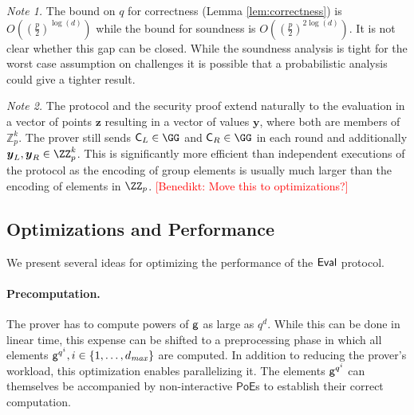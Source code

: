 \documentclass{article}
\theoremstyle{definition}
\newcommand{\benedikt}[1]{{\textcolor{red}{[Benedikt: #1]}}}
\newcommand{\alan}[1]{{\todo[color=blue!40!white]{Alan: #1}}}
\newcommand{\benedikt}[1]{}
\newcommand{\alan}[1]{}
\begin{document}
\textit{Note 1.}
The bound on $q$ for correctness (Lemma \ref{lem:correctness}) is $O((\frac{p}{2})^{\log(d)})$ while the bound for soundness is $O((\frac{p}{2})^{2 \log(d)})$. It is not clear whether this gap can be closed. While the soundness analysis is tight for the worst case assumption on challenges it is possible that a probabilistic analysis could give a tighter result.

\textit{Note 2.} The protocol and the security proof extend naturally to the evaluation in a vector of points $\boldsymbol{z}$ resulting in a vector of values $\boldsymbol{y}$, where both are members of $\mathbb{Z}_p^k$. The prover still sends $\gr{C}_L\in \GG$ and $\gr{C}_R\in \GG$ in each round and additionally $\boldsymbol{y}_L,\boldsymbol{y}_R \in \ZZ^k_p$. This is significantly more efficient than independent executions of the protocol as the encoding of group elements is usually much larger than the encoding of elements in $\ZZ_p$. \benedikt{Move this to optimizations?}
\subsection{Optimizations and Performance}
\label{subsec:optimiztion}
We present several ideas for optimizing the performance of the $\textsf{{Eval}}$ protocol.

\paragraph{Precomputation.} The prover has to compute powers of $\mathsf{g}$ as large as $q^d$. While this can be done in linear time, this expense can be shifted to a preprocessing phase in which all elements $\mathsf{g}^{q^i}, i \in \{1, \ldots, d_{\it max}\}$ are computed. In addition to reducing the prover's workload, this optimization enables parallelizing it. The elements $\mathsf{g}^{q^i}$ can themselves be accompanied by non-interactive $\mathsf{PoE}$s to establish their correct computation.
\end{document}
